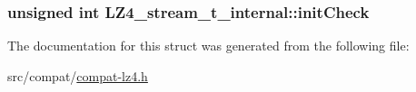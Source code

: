 \subsubsection[{init\+Check}]{\setlength{\rightskip}{0pt plus 5cm}unsigned int L\+Z4\+\_\+stream\+\_\+t\+\_\+internal\+::init\+Check}\label{struct_l_z4__stream__t__internal_aa37594c27fdfa2bdfd4176fd599819ce}


The documentation for this struct was generated from the following file\+:\begin{DoxyCompactItemize}
\item 
src/compat/\hyperlink{compat-lz4_8h}{compat-\/lz4.\+h}\end{DoxyCompactItemize}
